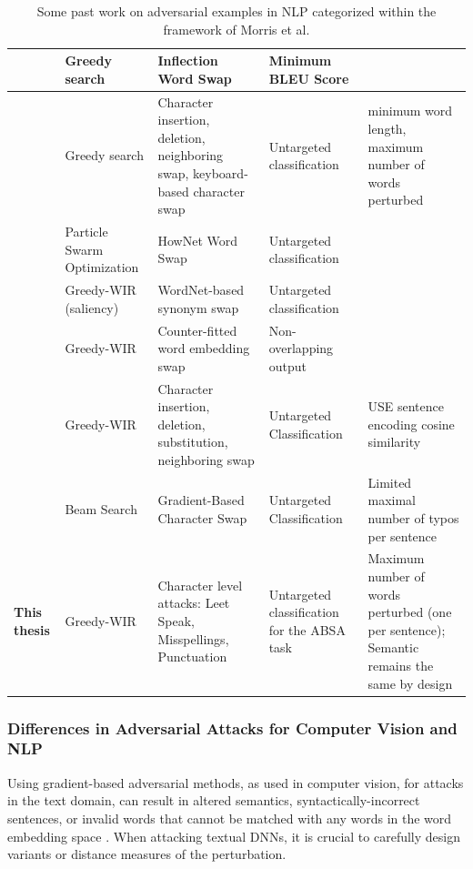 \begin{table}[H]
\begin{adjustwidth}{-0cm}{}
\small
\begin{tabular}{p{2cm}|p{2cm}p{3cm}p{2cm}p{4cm}}


\midrule
\textbf{\cite{tan2020s}}&Greedy search &Inflection Word Swap &Minimum BLEU Score & \\
\midrule
\textbf{\cite{pruthi2019combating}} &Greedy search &Character insertion, deletion, neighboring swap, keyboard-based character swap &Untargeted classification &minimum word length, maximum number of words perturbed \\
\midrule
\textbf{\cite{zang2020word}} &Particle Swarm Optimization&HowNet Word Swap &Untargeted classification & \\
\midrule
\textbf{\cite{ren2019generating}} &Greedy-WIR (saliency) &WordNet-based synonym swap &Untargeted classification & \\
\midrule
\textbf{\cite{cheng2020seq2sick}} &Greedy-WIR &Counter-fitted word embedding swap &Non-overlapping output & \\
\midrule
\textbf{\cite{li2018textbugger}} &Greedy-WIR &Character insertion, deletion, substitution, neighboring swap&Untargeted Classification &USE sentence encoding cosine similarity \\
\midrule
\textbf{\cite{sun2020adv}} &Beam Search &Gradient-Based Character Swap&Untargeted Classification &Limited maximal number of typos per sentence\\
\midrule
\textbf{This thesis} &Greedy-WIR &Character level attacks: Leet Speak, Misspellings, Punctuation &Untargeted classification for the ABSA task &Maximum number of words perturbed (one per sentence); Semantic remains the same by design \\
\bottomrule
\end{tabular}
\end{adjustwidth}
\caption[Past work on adversarial examples in NLP]{Some past work on adversarial examples in NLP categorized within the framework of Morris et al.}
\label{tab:loooong}
\end{table}

\subsubsection{Differences in Adversarial Attacks for Computer Vision and NLP }
\label{sec:differences_in_adv-ex}

Using gradient-based adversarial methods, as used in computer vision, for attacks in the text domain, can result in altered semantics, syntactically-incorrect sentences, or invalid words that cannot be matched with any words in the word embedding space \cite{zhang2019adversarial}. When attacking textual DNNs, it is crucial to carefully design variants or distance measures of the perturbation.

